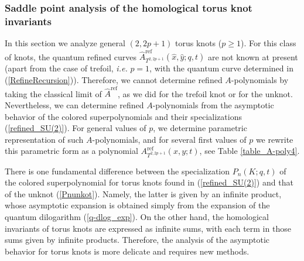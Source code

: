 \documentclass[hyper,letterpaper]{JHEP3}
\renewcommand{\hat}{\widehat}
\begin{document}
\subsubsection{Saddle point analysis of the homological torus knot invariants}
\label{sec:saddle_point}

In this section we analyze general $(2,2p+1)$ torus knots ($p \ge 1$).
For this class of knots, the quantum refined curves $\widehat{A}^{\text{ref}}_{T^{2,2p+1}}(\hat{x},\hat{y};q,t)$
are not known at present (apart from the case of trefoil, \emph{i.e.} $p=1$, with the quantum curve determined in (\ref{RefineRecursion})).
Therefore, we cannot determine refined $A$-polynomials by taking the classical limit of $\widehat{A}^{\text{ref}}$,
as we did for the trefoil knot or for the unknot.
Nevertheless, we can determine refined $A$-polynomials from the asymptotic behavior
of the colored superpolynomials and their specializations (\ref{refined_SU(2)}).
For general values of $p$, we determine parametric representation of such $A$-polynomials,
and for several first values of $p$ we rewrite this parametric form as
a polynomial $A^{\text{ref}}_{T^{2,2p+1}}(x,y;t)$, see Table \ref{table_A-poly4}.

There is one fundamental difference between the specialization $P_{n}(K;q,t)$
of the colored superpolynomial for torus knots found in (\ref{refined_SU(2)}) and that of the unknot (\ref{Pnunkot}).
Namely, the latter is given by an infinite product,
whose asymptotic expansion is obtained simply from the expansion of the quantum dilogarithm (\ref{q-dlog_exp}).
On the other hand, the homological invariants of torus knots are expressed as infinite sums,
with each term in those sums given by infinite products.
Therefore, the analysis of the asymptotic behavior for torus knots is more delicate and requires new methods.
\end{document}
